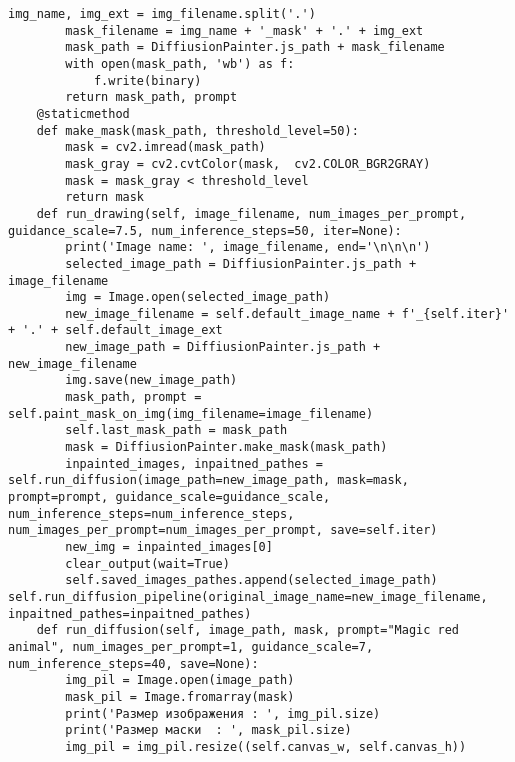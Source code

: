 \begin{lstlisting}[basicstyle=\ttfamily\small]
        img_name, img_ext = img_filename.split('.')
        mask_filename = img_name + '_mask' + '.' + img_ext
        mask_path = DiffiusionPainter.js_path + mask_filename
        with open(mask_path, 'wb') as f:
            f.write(binary)
        return mask_path, prompt
    @staticmethod
    def make_mask(mask_path, threshold_level=50):
        mask = cv2.imread(mask_path)
        mask_gray = cv2.cvtColor(mask,  cv2.COLOR_BGR2GRAY)
        mask = mask_gray < threshold_level
        return mask
    def run_drawing(self, image_filename, num_images_per_prompt, guidance_scale=7.5, num_inference_steps=50, iter=None):
        print('Image name: ', image_filename, end='\n\n\n')
        selected_image_path = DiffiusionPainter.js_path + image_filename
        img = Image.open(selected_image_path)
        new_image_filename = self.default_image_name + f'_{self.iter}' + '.' + self.default_image_ext
        new_image_path = DiffiusionPainter.js_path + new_image_filename
        img.save(new_image_path)
        mask_path, prompt = self.paint_mask_on_img(img_filename=image_filename)
        self.last_mask_path = mask_path
        mask = DiffiusionPainter.make_mask(mask_path)
        inpainted_images, inpaitned_pathes = self.run_diffusion(image_path=new_image_path, mask=mask, prompt=prompt, guidance_scale=guidance_scale, num_inference_steps=num_inference_steps, num_images_per_prompt=num_images_per_prompt, save=self.iter)
        new_img = inpainted_images[0]
        clear_output(wait=True)
        self.saved_images_pathes.append(selected_image_path)      self.run_diffusion_pipeline(original_image_name=new_image_filename, inpaitned_pathes=inpaitned_pathes)
    def run_diffusion(self, image_path, mask, prompt="Magic red animal", num_images_per_prompt=1, guidance_scale=7, num_inference_steps=40, save=None):
        img_pil = Image.open(image_path)
        mask_pil = Image.fromarray(mask)
        print('Размер изображения : ', img_pil.size)
        print('Размер маски  : ', mask_pil.size)
        img_pil = img_pil.resize((self.canvas_w, self.canvas_h))
        \end{lstlisting}
